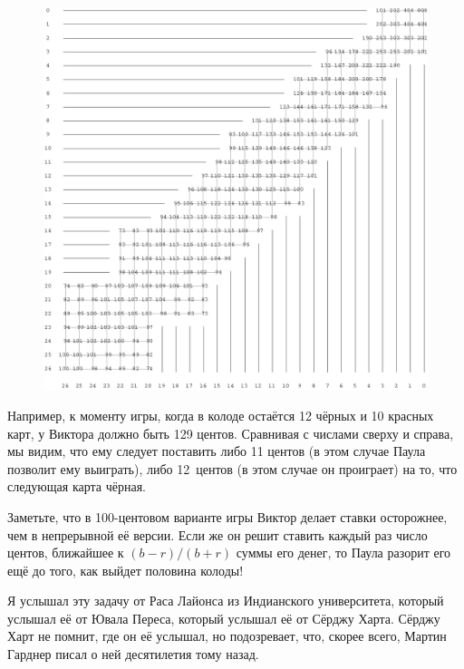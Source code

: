 \documentclass[twoside]{book}
\begin{document}
\begin{figure}[!ht]
\centering
\includegraphics[width=\textwidth]{Figs/Games/ioana} %
\end{figure}

Например, к моменту игры, когда в колоде остаётся 12 чёрных и 10 красных карт, у Виктора должно быть 129 %
центов. 
Сравнивая с числами сверху и справа, мы видим, что ему следует поставить либо 11 центов (в этом случае Паула позволит ему выиграть), либо 12~центов (в этом случае он проиграет) на то, что следующая карта чёрная.

Заметьте, что в 100-центовом варианте игры Виктор делает ставки осторожнее, чем в непрерывной её версии.
Если же он решит ставить каждый раз число центов, ближайшее к $(b - r)/(b + r)$ суммы его денег, то Паула разорит его ещё до того, как выйдет половина колоды!

\medskip

Я услышал эту задачу от Раса Лайонса из Индианского университета, %
который услышал её от Ювала Переса, %
который услышал её от Сёрджу Харта. %
Сёрджу Харт не помнит, где он её услышал, но подозревает, что, скорее всего, Мартин Гарднер писал о ней десятилетия тому назад.
\end{document}

